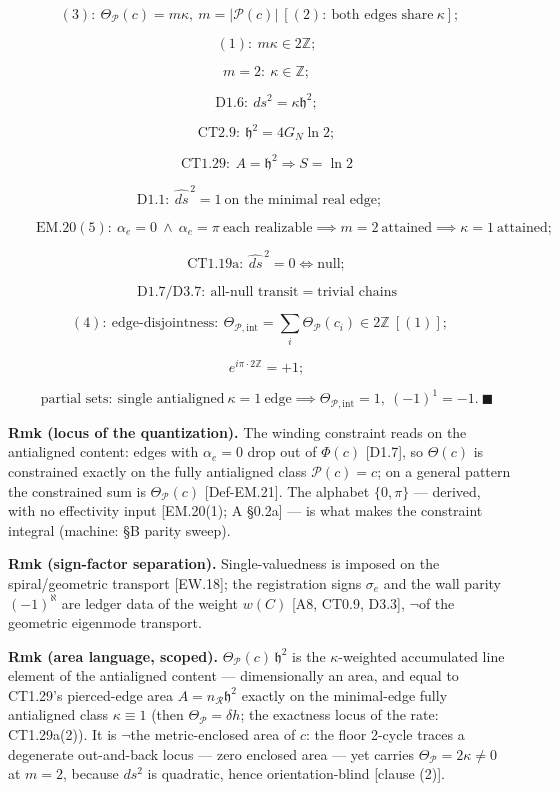\begin{theorem}
\[
(3):\ \Theta_{\mathcal P}(c)=m\kappa,\ m=|\mathcal P(c)|\ [(2):\ \text{both edges share}\ \kappa];
\]

\[
\quad (1):\ m\kappa\in2\mathbb Z;
\]

\[
\quad m=2:\ \kappa\in\mathbb Z;
\]

\[
\quad \mathrm{D1.6}:\ ds^2=\kappa\mathfrak h^2;
\]

\[
\quad \mathrm{CT2.9}:\ \mathfrak h^2=4G_N\ln2;
\]

\[
\quad \mathrm{CT1.29}:\ A=\mathfrak h^2\Rightarrow S=\ln2
\]

\[
\mathrm{D1.1}:\ \widehat{ds}^{\,2}=1\ \text{on the minimal real edge};
\]

\[
\qquad \mathrm{EM.20}(5):\ \alpha_e=0\ \wedge\ \alpha_e=\pi\ \text{each realizable}\implies m=2\ \text{attained}\implies\kappa=1\ \text{attained};
\]

\[
\quad \mathrm{CT1.19a}:\ \widehat{ds}^{\,2}=0\iff\text{null};
\]

\[
\quad \mathrm{D1.7}/\mathrm{D3.7}:\ \text{all-null transit}=\text{trivial chains}
\]

\[
(4):\ \text{edge-disjointness}:\ \Theta_{\mathcal P,\mathrm{int}}=\sum_i\Theta_{\mathcal P}(c_i)\in2\mathbb Z\ [(1)];
\]

\[
\quad e^{i\pi\cdot2\mathbb Z}=+1;
\]

\[
\quad \text{partial sets}:\ \text{single antialigned}\ \kappa=1\ \text{edge}\implies\Theta_{\mathcal P,\mathrm{int}}=1,\ (-1)^1=-1.\ \blacksquare
\]

\textbf{Rmk (locus of the quantization).} The winding constraint reads on the antialigned content: edges with $\alpha_e=0$ drop out of $\Phi(c)$ [D1.7], so $\Theta(c)$ is constrained exactly on the fully antialigned class $\mathcal P(c)=c$; on a general pattern the constrained sum is $\Theta_{\mathcal P}(c)$ [Def-EM.21]. The alphabet $\{0,\pi\}$ — derived, with no effectivity input [EM.20(1); A §0.2a] — is what makes the constraint integral (machine: §B parity sweep).

\textbf{Rmk (sign-factor separation).} Single-valuedness is imposed on the spiral/geometric transport [EW.18]; the registration signs $\sigma_e$ and the wall parity $(-1)^{\aleph}$ are ledger data of the weight $w(C)$ [A8, CT0.9, D3.3], $\neg$of the geometric eigenmode transport.

\textbf{Rmk (area language, scoped).} $\Theta_{\mathcal P}(c)\,\mathfrak h^2$ is the $\kappa$-weighted accumulated line element of the antialigned content — dimensionally an area, and equal to CT1.29's pierced-edge area $A=n_{\mathcal R}\mathfrak h^2$ exactly on the minimal-edge fully antialigned class $\kappa\equiv1$ (then $\Theta_{\mathcal P}=\delta h$; the exactness locus of the rate: CT1.29a(2)). It is $\neg$the metric-enclosed area of $c$: the floor 2-cycle traces a degenerate out-and-back locus — zero enclosed area — yet carries $\Theta_{\mathcal P}=2\kappa\ne0$ at $m=2$, because $ds^2$ is quadratic, hence orientation-blind [clause (2)].


\end{theorem}
